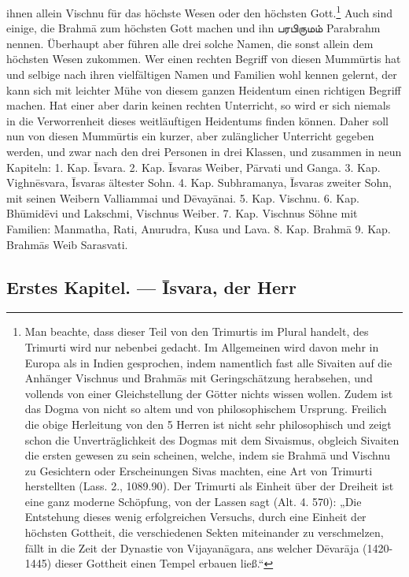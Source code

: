 \documentclass{article}
\newcommand{\TamilText}[1]{\texttamil{#1}}
\newcommand{\tam}[1]{\TamilText{#1}}
\begin{document}
ihnen allein Vischnu für das höchste Wesen oder den höchsten Gott.\footnote{Man beachte, dass dieser Teil von den Trimurtis im Plural handelt, des Trimurti wird nur nebenbei gedacht. Im Allgemeinen wird davon mehr in Europa als in Indien gesprochen, indem namentlich fast alle Sivaiten auf die Anhänger Vischnus und Brahm\={a}s mit Geringschätzung herabsehen, und vollends von einer Gleichstellung der Götter nichts wissen wollen. Zudem ist das Dogma von nicht so altem und von philosophischem Ursprung. Freilich die obige Herleitung von den 5 Herren ist nicht sehr philosophisch und zeigt schon die Unverträglichkeit des Dogmas mit dem Sivaismus, obgleich Sivaiten die ersten gewesen zu sein scheinen, welche, indem sie Brahm\={a} und Vischnu zu Gesichtern oder Erscheinungen Sivas machten, eine Art von Trimurti herstellten (Lass. 2., 1089.90). Der Trimurti als Einheit über der Dreiheit ist eine ganz moderne Schöpfung, von der Lassen sagt (Alt. 4. 570): „Die Entstehung dieses wenig erfolgreichen Versuchs, durch eine Einheit der höchsten Gottheit, die verschiedenen Sekten miteinander zu verschmelzen, fällt in die Zeit der Dynastie von Vijayan\={a}gara, ans welcher D\={e}var\={a}ja (1420-1445) dieser Gottheit einen Tempel erbauen ließ.“} Auch sind einige, die Brahm\={a} zum höchsten Gott machen und ihn \tam{பரபிருமம்} Parabrahm nennen. Überhaupt aber führen alle drei solche Namen, die sonst allein dem höchsten Wesen zukommen. Wer einen rechten Begriff von diesen Mumm\={u}rtis hat und selbige nach ihren vielfältigen Namen und Familien wohl kennen gelernt, der kann sich mit leichter Mühe von diesem ganzen Heidentum einen richtigen Begriff machen. Hat einer aber darin keinen rechten Unterricht, so wird er sich niemals in die Verworrenheit dieses weitläuftigen Heidentums finden können. Daher soll nun von diesen Mumm\={u}rtis ein kurzer, aber zulänglicher Unterricht gegeben werden, und zwar nach den drei Personen in drei Klassen, und zusammen in neun Kapiteln: 1. Kap. \={I}svara. 2. Kap. \={I}svaras Weiber, P\={a}rvati und Ganga. 3. Kap. Vighn\={e}svara, \={I}svaras ältester Sohn. 4. Kap. Subhramanya, \={I}svaras zweiter Sohn, mit seinen Weibern Valliammai und D\={e}vay\={a}nai. 5. Kap. Vischnu. 6. Kap. Bh\={u}mid\={e}vi und Lakschmi, Vischnus Weiber. 7. Kap. Vischnus Söhne mit Familien: Manmatha, Rati, Anurudra, Kusa und Lava. 8. Kap. Brahm\={a} 9. Kap. Brahm\={a}s Weib Sarasvati.

\clearpage
\subsection{Erstes Kapitel. — \={I}svara, der Herr}
\end{document}
